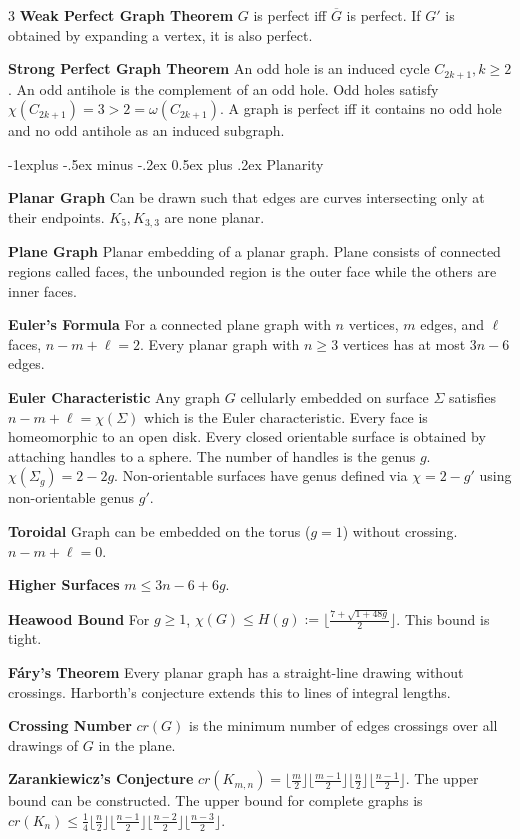 \documentclass[10pt, landscape]{article}
\makeatletter
\renewcommand{\section}{\@startsection{section}{1}{0mm}%
                                {-1ex plus -.5ex minus -.2ex}%
                                {0.5ex plus .2ex}%
                                {\normalfont\large\bfseries}}
\renewcommand{\section}{\@startsection{section}{2}{0mm}%
                                {-1explus -.5ex minus -.2ex}%
                                {0.5ex plus .2ex}%
                                {\normalfont\normalsize\bfseries}}
\makeatother
\begin{document}
\begin{multicols*}{3}
\textbf{Weak Perfect Graph Theorem} $G$ is perfect iff $\overline{G}$ is perfect. If $G'$ is obtained by expanding a vertex, it is also perfect.

\textbf{Strong Perfect Graph Theorem} An odd hole is an induced cycle $C_{2k+1}, k \geq 2$. An odd antihole is the complement of an odd hole. Odd holes satisfy $\chi(C_{2k+1})=3>2=\omega(C_{2k+1})$. A graph is perfect iff it contains no odd hole and no odd antihole as an induced subgraph.

\section{Planarity}

\textbf{Planar Graph} Can be drawn such that edges are curves intersecting only at their endpoints. $K_5, K_{3,3}$ are none planar.

\textbf{Plane Graph} Planar embedding of a planar graph. Plane consists of connected regions called faces, the unbounded region is the outer face while the others are inner faces.

\textbf{Euler's Formula} For a connected plane graph with $n$ vertices, $m$ edges, and $\ell$ faces, $n-m+\ell=2$. Every planar graph with $n \geq 3$ vertices has at most $3n-6$ edges.

\textbf{Euler Characteristic} Any graph $G$ cellularly embedded on surface $\Sigma$ satisfies $n-m+\ell=\chi(\Sigma)$ which is the Euler characteristic. Every face is homeomorphic to an open disk. Every closed orientable surface is obtained by attaching handles to a sphere. The number of handles is the genus $g$. $\chi(\Sigma_g)=2-2g$. Non-orientable surfaces have genus defined via $\chi=2-g'$ using non-orientable genus $g'$.

\textbf{Toroidal} Graph can be embedded on the torus ($g=1$) without crossing. $n-m+\ell=0$.

\textbf{Higher Surfaces} $m \leq 3n-6+6g$.

\textbf{Heawood Bound} For $g \geq 1$, $\chi(G) \leq H(g) := \lfloor \frac{7+\sqrt{1+48g}}{2} \rfloor$. This bound is tight.

\textbf{Fáry's Theorem} Every planar graph has a straight-line drawing without crossings. Harborth's conjecture extends this to lines of integral lengths.

\textbf{Crossing Number} $cr(G)$ is the minimum number of edges crossings over all drawings of $G$ in the plane.

\textbf{Zarankiewicz's Conjecture} $cr(K_{m,n})=\lfloor \frac{m}{2}\rfloor \lfloor \frac{m-1}{2}\rfloor \lfloor \frac{n}{2}\rfloor \lfloor\frac{n-1}{2}\rfloor$. The upper bound can be constructed. The upper bound for complete graphs is $cr(K_n) \leq \frac{1}{4} \lfloor \frac{n}{2} \rfloor \lfloor \frac{n-1}{2} \rfloor \lfloor \frac{n-2}{2} \rfloor \lfloor \frac{n-3}{2} \rfloor$.


\end{multicols*}
\end{document}
